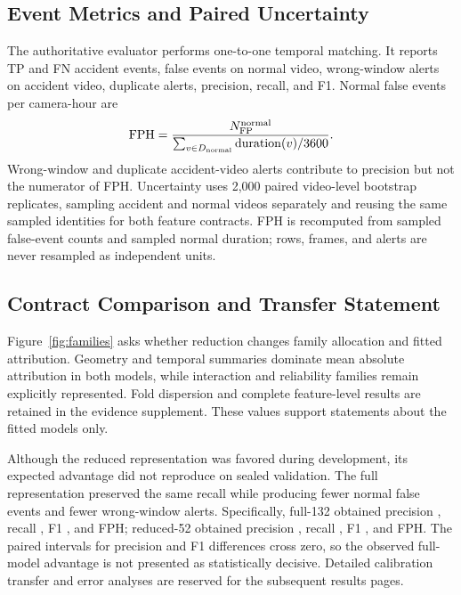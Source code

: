 \documentclass[letterpaper]{article}
\begin{document}
\subsection{Event Metrics and Paired Uncertainty}
The authoritative evaluator performs one-to-one temporal matching. It reports TP and FN accident events, false events on normal video, wrong-window alerts on accident video, duplicate alerts, precision, recall, and F1. Normal false events per camera-hour are
\begin{equation}
 \mathrm{FPH}=\frac{N_{\rm FP}^{\rm normal}}
 {\sum_{v\in D_{\rm normal}}\mathrm{duration}(v)/3600}.
\end{equation}
Wrong-window and duplicate accident-video alerts contribute to precision but not the numerator of FPH. Uncertainty uses 2,000 paired video-level bootstrap replicates, sampling accident and normal videos separately and reusing the same sampled identities for both feature contracts. FPH is recomputed from sampled false-event counts and sampled normal duration; rows, frames, and alerts are never resampled as independent units.

\subsection{Contract Comparison and Transfer Statement}
Figure~\ref{fig:families} asks whether reduction changes family allocation and fitted attribution. Geometry and temporal summaries dominate mean absolute attribution in both models, while interaction and reliability families remain explicitly represented. Fold dispersion and complete feature-level results are retained in the evidence supplement. These values support statements about the fitted models only.

Although the reduced representation was favored during development, its expected advantage did not reproduce on sealed validation. The full representation preserved the same recall while producing fewer normal false events and fewer wrong-window alerts. Specifically, full-132 obtained precision \FullPrecision{}, recall \FullRecall{}, F1 \FullFOne{}, and \FullFPH{} FPH; reduced-52 obtained precision \ReducedPrecision{}, recall \ReducedRecall{}, F1 \ReducedFOne{}, and \ReducedFPH{} FPH. The paired intervals for precision and F1 differences cross zero, so the observed full-model advantage is not presented as statistically decisive. Detailed calibration transfer and error analyses are reserved for the subsequent results pages.

\clearpage
\end{document}
